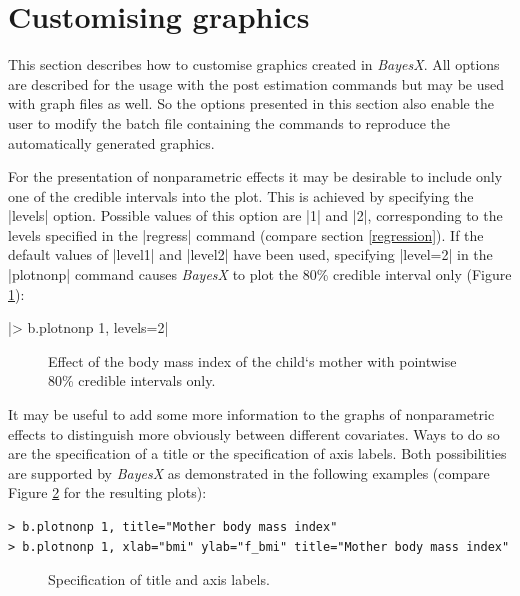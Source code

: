 \documentclass[a4paper]{article}
\begin{document}
\section{Customising graphics}\label{custom}

This section describes how to customise graphics created in {\em
BayesX}. All options are described for the usage with the post
estimation commands but may be used with graph files as well. So
the options presented in this section also enable the user to
modify the batch file containing the commands to reproduce the
automatically generated graphics.

For the presentation of nonparametric effects it may be desirable to include only one of the credible intervals into the plot.
This is achieved by specifying the |levels| option. Possible values of this option are |1| and |2|, corresponding to the levels
specified in the |regress| command (compare section \ref{regression}). If the default values of |level1| and |level2| have been
used, specifying |level=2| in the |plotnonp| command causes {\it BayesX} to plot the 80\% credible interval only (Figure
\ref{bmi3}):

|> b.plotnonp 1, levels=2|

\begin{figure}[ht]
\begin{center}
 {\it\caption{Effect of
the body mass index of the child`s mother with pointwise 80\%
credible intervals only.\label{bmi3}}}
\end{center}
\end{figure}

It may be useful to add some more information to the graphs of
nonparametric effects to distinguish more obviously between
different covariates. Ways to do so are the specification of a
title or the specification of axis labels. Both possibilities are
supported by {\it BayesX} as demonstrated in the following
examples (compare Figure \ref{bmi4} for the resulting plots):

\begin{verbatim}
> b.plotnonp 1, title="Mother body mass index"
> b.plotnonp 1, xlab="bmi" ylab="f_bmi" title="Mother body mass index"
\end{verbatim}

\begin{figure}[ht]
\begin{center}
\begin{multicols}{2}
\end{multicols}
{\it\caption{Specification of title and axis labels.\label{bmi4}}}
\end{center}
\end{figure}
\end{document}

